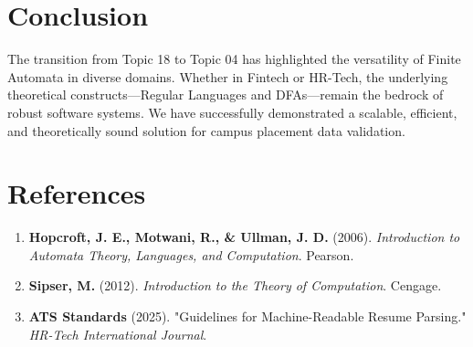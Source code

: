\documentclass[12pt,a4paper]{article}
\begin{document}
\section{Conclusion}
The transition from Topic 18 to Topic 04 has highlighted the versatility of Finite Automata in diverse domains. Whether in Fintech or HR-Tech, the underlying theoretical constructs—Regular Languages and DFAs—remain the bedrock of robust software systems. We have successfully demonstrated a scalable, efficient, and theoretically sound solution for campus placement data validation.

\section{References}
\begin{enumerate}
    \item \textbf{Hopcroft, J. E., Motwani, R., \& Ullman, J. D.} (2006). \textit{Introduction to Automata Theory, Languages, and Computation}. Pearson.
    \item \textbf{Sipser, M.} (2012). \textit{Introduction to the Theory of Computation}. Cengage.
    \item \textbf{ATS Standards} (2025). "Guidelines for Machine-Readable Resume Parsing." \textit{HR-Tech International Journal}.
\end{enumerate}
\end{document}
